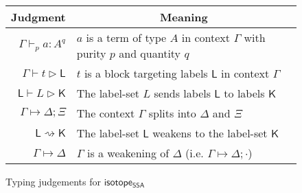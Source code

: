 \documentclass[acmsmall,screen,review]{acmart}
\newcommand{\ms}[1]{\ensuremath{\mathsf{#1}}}
\newcommand{\csplits}[3]{#1 \mapsto #2;#3}
\newcommand{\cwk}[2]{#1 \mapsto #2}
\newcommand{\lwk}[2]{#1 \rightsquigarrow #2}
\newcommand{\tlin}[2]{#2 \subseteq \ms{lin}(#1)}
\newcommand{\ltlin}[3]{#3 \subseteq \ms{lin}(#1) \cap #2}
\newcommand{\hasty}[5]{#1 \vdash_{#2} #3: {#4}^{#5}}
\newcommand{\haslb}[3]{#1 \vdash #2 \rhd #3}
\newcommand{\lhaslb}[3]{#1 \vdash #2 \rhd #3}
\newcommand{\isotopessa}{\ms{isotope_{SSA}}}
\begin{document}
\begin{figure}
  \begin{center}        
    \begingroup
    \renewcommand{\arraystretch}{1.5}
    \setlength{\tabcolsep}{2em}
    \begin{tabular}{rl}
        \multicolumn{1}{c}{Judgment} & \multicolumn{1}{c}{Meaning} \\ \hline
        \(\hasty{\Gamma}{p}{a}{A}{q}\) &
        \(a\) is a term of type \(A\) in context \(\Gamma\) with purity \(p\) and quantity \(q\) \\
        \(\haslb{\Gamma}{t}{\ms{L}}\) &
        \(t\) is a block targeting labels \(\ms{L}\) in context \(\Gamma\) \\
        \(\lhaslb{\ms{L}}{L}{\ms{K}}\) &
        The label-set \(L\) sends labels \(\ms{L}\) to labels \(\ms{K}\) \\
        \(\csplits{\Gamma}{\Delta}{\Xi}\) &
        The context \(\Gamma\) splits into \(\Delta\) and \(\Xi\) \\
        \(\lwk{\ms{L}}{\ms{K}}\) &
        The label-set \(\ms{L}\) weakens to the label-set \(\ms{K}\) \\
        \(\cwk{\Gamma}{\Delta}\) &
        \(\Gamma\) is a weakening of \(\Delta\) 
        (i.e. \(\csplits{\Gamma}{\Delta}{\cdot}\))
    \end{tabular}
    \endgroup
  \end{center}
  \caption{Typing judgements for \isotopessa}
  \label{fig:ssa-judgements}
\end{figure}
\end{document}
